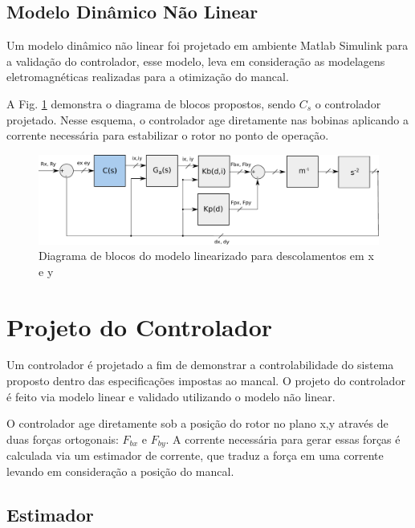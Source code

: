 \subsection{Modelo Dinâmico Não Linear}

Um modelo dinâmico não linear foi projetado em ambiente Matlab Simulink para a validação do controlador, esse modelo, leva em consideração as modelagens eletromagnéticas realizadas para a otimização do mancal.

A Fig. \ref{fig:diagrama:blocos:modelo:linear} demonstra o diagrama de blocos propostos, sendo $C_s$ o controlador projetado. Nesse esquema, o controlador age diretamente nas bobinas aplicando a corrente necessária para estabilizar o rotor no ponto de operação. 

\begin{figure}[th!]
	\centering
	\includegraphics[width=1\linewidth]{../Figs/Modelagem/diagrama_blocos_modelo_linear}
	\caption{Diagrama de blocos do modelo linearizado para descolamentos em x e y}
	\label{fig:diagrama:blocos:modelo:linear}
\end{figure}


\section{Projeto do Controlador}

Um controlador é projetado a fim de demonstrar a controlabilidade do sistema proposto dentro das especificações impostas ao mancal. O projeto do controlador é feito via modelo linear e validado utilizando o modelo não linear. 

O controlador age diretamente sob a posição do rotor no plano x,y através de duas forças ortogonais: $F_{bx}$ e $F_{by}$. A corrente necessária para gerar essas forças é calculada via um estimador de corrente, que traduz a força em uma corrente levando em consideração a posição do mancal.

\subsection{Estimador}
	
